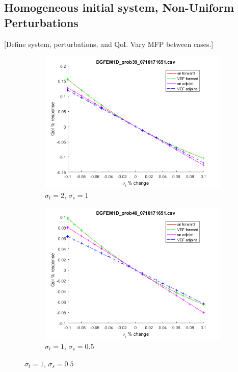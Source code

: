 \documentclass{article}
\newcommand{\sigt}{\sigma_t}
\newcommand{\sigs}{\sigma_s}
\begin{document}
\subsection{Homogeneous initial system, Non-Uniform Perturbations}

[Define system,  perturbations, and QoI. Vary MFP between cases.]
\begin{figure}[H]
\label{InHomoPertt}
\begin{subfigure}{.5\textwidth}
  \centering
  \includegraphics[width=.8\linewidth]{figures/39sigtSens.png}
  \caption{$\sigt=2$, $\sigs=1$}
  \label{fig:sfig1}
\end{subfigure}%
\begin{subfigure}{.5\textwidth}
  \centering
  \includegraphics[width=.8\linewidth]{figures/40sigtSens.png}
  \caption{$\sigt=1$, $\sigs=0.5$}
  \label{fig:sfig2}
\end{subfigure}

\end{figure}
\end{document}

